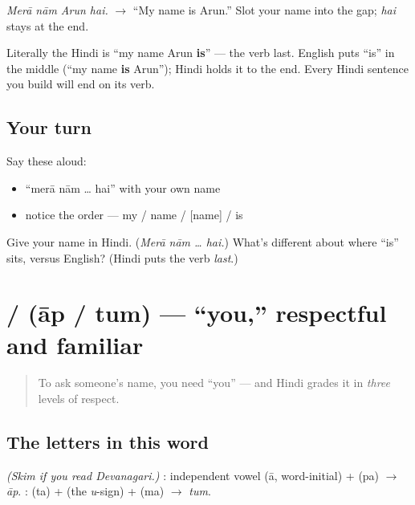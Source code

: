 \emph{Merā nām Arun hai.} $\to$ \textquotedblleft{}My name is Arun.\textquotedblright{} Slot your name into the gap; \emph{hai} stays at the end.

\begin{grammarlens}[title={Grammar Lens: subject–object–verb}]
Literally the Hindi is \textquotedblleft{}my name Arun \textbf{is}\textquotedblright{} — the verb last. English puts \textquotedblleft{}is\textquotedblright{} in the middle (\textquotedblleft{}my name \textbf{is} Arun\textquotedblright{}); Hindi holds it to the end. Every Hindi sentence you build will end on its verb.
\end{grammarlens}

\subsection*{Your turn}
Say these aloud:

\begin{itemize}
\raggedright
  \item \textquotedblleft{}merā nām … hai\textquotedblright{} with your own name
  \item notice the order — my / name / {[}name{]} / is
\end{itemize}

\begin{tcolorbox}[breakable,colback=teal!4,colframe=teal!35!black,title={Before you move on}]
Give your name in Hindi. (\emph{Merā nām … hai.}) What's different about where \textquotedblleft{}is\textquotedblright{} sits, versus English? (Hindi puts the verb \emph{last}.)
\end{tcolorbox}
\section[\texorpdfstring{\hi{आप} / \hi{तुम} (āp / tum)}{आप / तुम (āp / tum)}]{ /  (āp / tum) — \textquotedblleft{}you,\textquotedblright{} respectful and familiar}

\label{lesson:HI-C02-aap-tum}



\begin{quote}
To ask someone's name, you need \textquotedblleft{}you\textquotedblright{} — and Hindi grades it in \emph{three} levels of respect.
\end{quote}

\subsection*{The letters in this word}
\emph{(Skim if you read Devanagari.)} \textbf{}: independent vowel \textbf{} (ā, word-initial) + \textbf{} (pa) $\to$ \emph{āp}. \textbf{}: \textbf{} (ta) + \textbf{} (the \emph{u}-sign) + \textbf{} (ma) $\to$ \emph{tum}.

